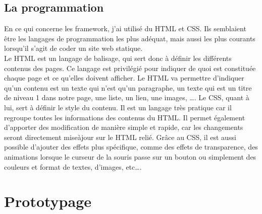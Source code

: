 \documentclass[a4,10pt,french]{sphinxmanual}
\begin{document}
\section{La programmation}
\label{\detokenize{technologies-utilisees:la-programmation}}
\sphinxAtStartPar
En ce qui concerne les framework, j’ai utilisé du HTML et CSS. Ils semblaient être les langages de programmation les plus adéquat, mais aussi les plus courants lorsqu’il s’agit de coder un site web statique.\\
Le HTML est un langage de balisage, qui sert donc à définir les différents contenus des pages. Ce langage est privilégié pour indiquer de quoi est constituée chaque page et ce qu’elles doivent afficher. Le HTML va permettre d’indiquer qu’un contenu est un texte qui n’est qu’un paragraphe, un texte qui est un titre de niveau 1 dans notre page, une liste, un lien, une images, ….
Le CSS, quant à lui, sert à définir le style du contenu. Il est un langage très pratique car il regroupe toutes les informations des contenus du HTML. Il permet également d’apporter des modification de manière simple et rapide, car les changements seront directement mise\sphinxhyphen{}à\sphinxhyphen{}jour sur le HTML relié. Grâce au CSS, il est aussi possible d’ajouter des effets plus spécifique, comme des effets de transparence, des animations lorsque le curseur de la souris passe sur un bouton ou simplement des couleurs et format de textes, d’images, etc….


\chapter{Prototypage}
\label{\detokenize{chapitre-02:prototypage}}\label{\detokenize{chapitre-02::doc}}
\end{document}
